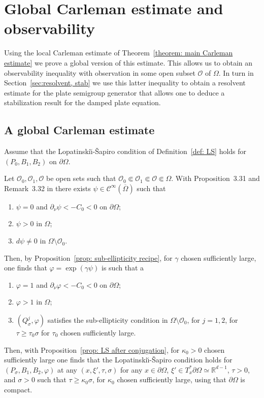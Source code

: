 \documentclass[10pt]{amsart}
\theoremstyle{plain}
\theoremstyle{definition}
\def\R{\mathbb{R}}
\newcommand{\LS}{Lopatinski\u{\i}-\v{S}apiro\xspace}
\newcommand{\suff}{sufficiently\xspace}
\let\csp\gamma
\let\k\kappa
\newcommand{\ovl}[1]{\overline{#1}}
\newcommand{\scrO}{\mathscr O}
\newcommand{\Psig}{P_{\sigma}}
\newcommand{\Qsig}{Q_{\sigma}}
\newcommand{\Con}{\ensuremath{\mathscr C}}
\newcommand{\Cinf}{\ensuremath{\Con^\infty}}
\begin{document}
\section{Global Carleman estimate and observability}
\label{sec: Global Carleman estimate}
Using the local Carleman estimate of Theorem~\ref{theorem: main Carleman
estimate} we prove a global version of this estimate.
This allows us to obtain an observability inequality with observation in some open subset
$\scrO$ of $\Omega$.
In turn in Section~\ref{sec:resolvent, stab} we use this
latter inequality to obtain a resolvent estimate for the plate
semigroup generator that allows one to deduce a stabilization result
for the damped plate equation.

\subsection{A global Carleman estimate}
Assume that the \LS condition of Definition~\ref{def: LS} holds for $(P_0, B_1, B_2)$ on $\partial
\Omega$.

Let $\scrO_0, \scrO_1, \scrO$ be open sets such that $\scrO_0 \Subset \scrO_1\Subset \scrO \Subset\Omega$. With
Proposition~3.31 and Remark~3.32 in \cite{JGL-vol1} there exists $\psi
\in \Cinf(\ovl{\Omega})$ such that
\begin{enumerate}
\item $\psi = 0$ and $\partial_\nu \psi <- C_0<0$ on $\partial \Omega$;
\item $\psi >0$ in $\Omega$;
\item $d \psi \neq 0$ in $\Omega \setminus \scrO_0$.
\end{enumerate}
Then, by Proposition~\ref{prop: sub-ellipticity recipe}, for $\csp$
chosen \suff large, one finds that $\varphi = \exp(\csp \psi)$ is such
that a
\begin{enumerate}
\item $\varphi = 1$ and $\partial_\nu \varphi <- C_0<0$ on $\partial \Omega$;
\item $\varphi >1$ in $\Omega$;
\item $(\Qsig^j,\varphi)$ satisfies the sub-ellipticity condition in
$\Omega \setminus \scrO_0$, for $j=1,2$, for $\tau \geq \tau_0
\sigma$ for $\tau_0$ chosen \suff large.
\end{enumerate}
Then, with Proposition~\ref{prop: LS after conjugation}, for $\k_0>0$
chosen \suff large one finds that the \LS condition holds for
$(\Psig, B_1, B_2, \varphi)$ at any
$(x,\xi',\tau,\sigma)$ for any $x \in \partial \Omega$, $\xi' \in
T_x^* \partial \Omega \simeq \R^{d-1}$, $\tau>0$, and $\sigma>0$ such that $\tau \geq
\k_0 \sigma$, for $\k_0$ chosen \suff large, using that $\partial
\Omega$ is compact.
\end{document}

